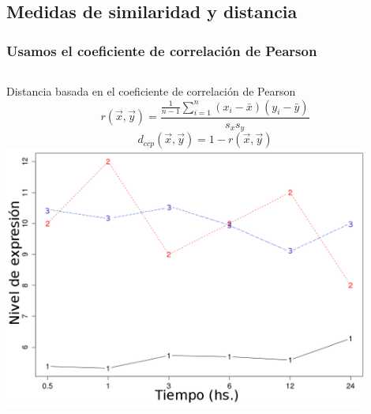 \documentclass[serif,9pt, t]{beamer}
\newcommand\Fontvi{\fontsize{7}{7.2}\selectfont}
\begin{document}
\subsection{Medidas de similaridad y distancia}
\begin{frame} \frametitle{Usamos el coeficiente de correlación de Pearson} 
\begin{columns}
\column{\dimexpr\paperwidth-30pt}
\vspace{30pt}
\begin{columns}[T]
	\centering
	Distancia basada en el coeficiente de correlación de Pearson\\
	\Fontvi
	\begin{equation*}
		r(\vec{x}, \vec{y}) = \frac{\frac{1}{n-1}\sum\limits_{i=1}^n(x_i-\bar{x})(y_i-\bar{y})}{s_x s_y}
	\end{equation*}
	\begin{equation*}
		d_{ccp}(\vec{x}, \vec{y}) = 1-r(\vec{x}, \vec{y})
	\end{equation*}
	\centering	
	\includegraphics[width=0.9\textwidth]{perfiles_ejemplo_metricas.png}\\
\end{columns}
\end{columns}
\end{frame}
\end{document}
